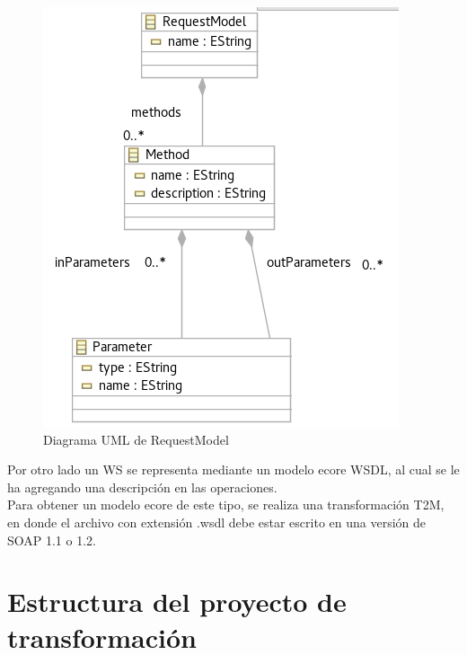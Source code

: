 





\begin{figure}[!h] 
	\begin{center}
		\includegraphics [scale=0.45]{imagenes/Diagrama_UML_RequestModel.png}
	\end{center}
	\caption{Diagrama UML de RequestModel}
	\label{fig:Diagrama UML de RequestModel}
\end{figure} 

Por otro lado un WS se representa mediante un modelo ecore WSDL, al cual se le ha agregando una descripción en las operaciones. \\

Para obtener un modelo ecore de este tipo, se realiza una transformación T2M, en donde el archivo con extensión .wsdl debe estar escrito en una versión de SOAP 1.1 o 1.2. 

\section{Estructura del proyecto de transformación}
\label{Estructura del proyecto de transformación}

